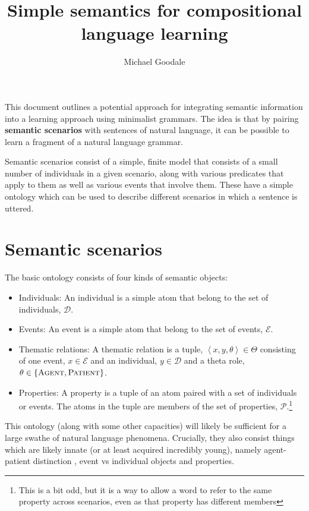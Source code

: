 \documentclass[11pt, a4paper]{article}
\author{Michael Goodale}
\title{Simple semantics for compositional language learning}
\begin{document}
\maketitle


This document outlines a potential approach for integrating semantic information into a learning approach using minimalist grammars. 
The idea is that by pairing \textbf{semantic scenarios} with sentences of natural language, it can be possible to learn a fragment of a natural language grammar.

Semantic scenarios consist of a simple, finite model that consists of a small number of individuals in a given scenario, along with various predicates that apply to them as well as various events that involve them.
These have a simple ontology which can be used to describe different scenarios in which a sentence is uttered.

\section{Semantic scenarios}

The basic ontology consists of four kinds of semantic objects:
\begin{itemize}
  \item Individuals: An individual is a simple atom that belong to the set of individuals, $\mathcal{D}$.
  \item Events: An event is a simple atom that belong to the set of events, $\mathcal{E}$. 
  \item Thematic relations: A thematic relation is a tuple, $\left\langle x, y, \theta\right\rangle\in \Theta$ consisting of one event, $x\in\mathcal{E}$ and an individual, $y\in\mathcal{D}$ and a theta role, $\theta\in\{\textsc{Agent}, \textsc{Patient}\}$.
  \item Properties: A property is a tuple of an atom paired with a set of individuals or events. The atoms in the tuple are members of the set of properties, $\mathcal{P}$.\footnote{This is a bit odd, but it is a way to allow a word to refer to the same property across scenarios, even as that property has different members}
\end{itemize}

This ontology (along with some other capacities) will likely be sufficient for a large swathe of natural language phenomena. 
Crucially, they also consist things which are likely innate (or at least acquired incredibly young), namely agent-patient distinction \autocite{papeo_abstract_2024}, event vs individual objects and properties. 
\end{document}

